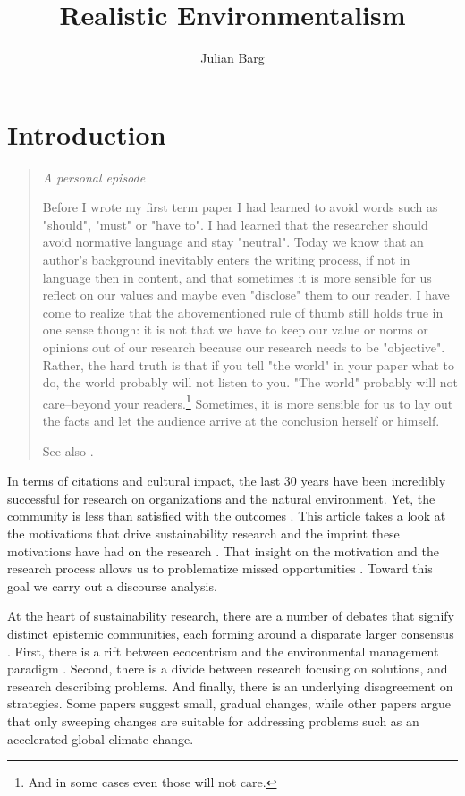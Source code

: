 \documentclass{article}
\title{Realistic Environmentalism}
\author{Julian Barg}
\begin{document}
	\maketitle

	\section*{Introduction}

	\begin{quote}
		\itshape
		A personal episode

		Before I wrote my first term paper I had learned to avoid words such as "should", "must" or "have to". I had learned that the researcher should avoid normative language and stay "neutral". Today we know that an author's background inevitably enters the writing process, if not in language then in content, and that sometimes it is more sensible for us reflect on our values and maybe even "disclose" them to our reader. I have come to realize that the abovementioned rule of thumb still holds true in one sense though: it is not that we have to keep our value or norms or opinions out of our research because our research needs to be "objective". Rather, the hard truth is that if you tell "the world" in your paper what to do, the world probably will not listen to you. "The world" probably will not care--beyond your readers.\footnote{And in some cases even those will not care.} Sometimes, it is more sensible for us to lay out the facts and let the audience arrive at the conclusion herself or himself.

		See also \citet{Gouldner1962,Zbaracki2021-02-03,Jones2019,Boisot2010}.
	\end{quote}

	In terms of citations and cultural impact, the last 30 years have been incredibly successful for research on organizations and the natural environment. Yet, the community is less than satisfied with the outcomes \cite[e.g.,][]{Ergene2020}. This article takes a look at the motivations that drive sustainability research and the imprint these motivations have had on the research \citep{Latour1987}. That insight on the motivation and the research process allows us to problematize missed opportunities \citep{Alvesson2011}. Toward this goal we carry out a discourse analysis.

	At the heart of sustainability research, there are a number of debates that signify distinct epistemic communities, each forming around a disparate larger consensus \citep[cf.][]{KnorrCetina2000}. First, there is a rift between ecocentrism and the environmental management paradigm \citep{Purser1995}. Second, there is a divide between research focusing on solutions, and research describing problems. And finally, there is an underlying disagreement on strategies. Some papers suggest small, gradual changes, while other papers argue that only sweeping changes are suitable for addressing problems such as an accelerated global climate change.
\end{document}
